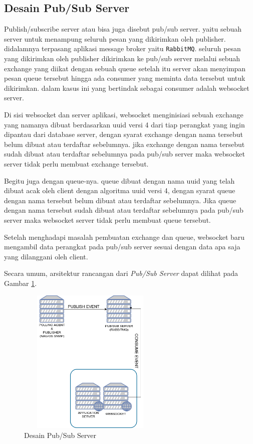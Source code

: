 		\subsection{Desain Pub/Sub Server}
			Publish/subscribe server atau bisa juga disebut pub/sub server. yaitu sebuah server untuk menampung seluruh pesan yang dikirimkan oleh publisher. didalamnya terpasang aplikasi message broker yaitu \texttt{RabbitMQ}. seluruh pesan yang dikirimkan oleh publisher dikirimkan ke pub/sub server melalui sebuah exchange yang diikat dengan sebuah queue setelah itu server akan menyimpan pesan queue tersebut hingga ada consumer yang meminta data tersebut untuk dikirimkan. dalam kasus ini yang bertindak sebagai consumer adalah websocket server.
			
			Di sisi websocket dan server aplikasi, websocket menginisiasi sebuah exchange yang namanya dibuat berdasarkan uuid versi 4 dari tiap perangkat yang ingin dipantau dari database server, dengan syarat exchange dengan nama tersebut belum dibuat atau terdaftar sebelumnya. jika exchange dengan nama tersebut sudah dibuat atau terdaftar sebelumnya pada pub/sub server maka websocket server tidak perlu membuat exchange tersebut.
			
			Begitu juga dengan queue-nya. queue dibuat dengan nama uuid yang telah dibuat acak oleh client dengan algoritma uuid versi 4, dengan syarat queue dengan nama tersebut belum dibuat atau terdaftar sebelumnya. Jika queue dengan nama tersebut sudah dibuat atau terdaftar sebelumnya pada pub/sub server maka websocket server tidak perlu membuat queue tersebut.
			
	 		Setelah menghadapi masalah pembuatan exchange dan queue, websocket baru mengambil data perangkat pada pub/sub server sesuai dengan data apa saja yang dilanggani oleh client.
	 		
        	Secara umum, arsitektur rancangan dari \textit{Pub/Sub Server} dapat dilihat pada Gambar \ref{desain:desainpubsub}.
        	\begin{figure}[H]
				\centering
				\includegraphics[width=7cm,height=7cm]{Images/C-3/desainpubsub.png}
				\caption{Desain Pub/Sub Server}
				\label{desain:desainpubsub}
			\end{figure}
		
